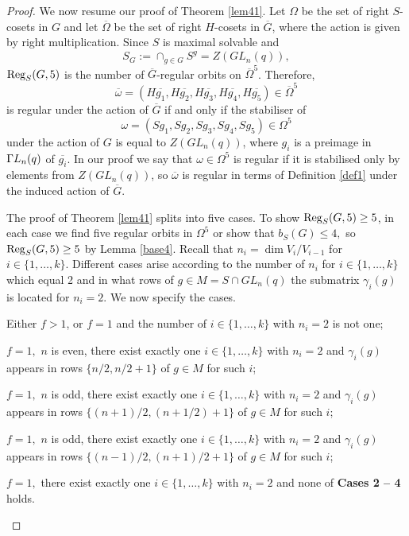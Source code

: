 \begin{proof}
We now resume our proof of Theorem \ref{lem41}.
Let $\Omega$ be the set of right $S$-cosets in $G$ and let $\overline{\Omega}$ be the set of right $H$-cosets in $\overline{G}$, where the action is given by  right multiplication.  Since $S$ is maximal solvable and $$S_{G}:=\cap_{g \in G} S^g=Z(GL_n(q)),$$ $\mathrm{Reg}_S(G,5)$ is the number of $\overline{G}$-regular orbits on  $\overline{\Omega}^5$.   Therefore, $$\overline{\omega}=(H\overline{g_1},H\overline{g_2},H\overline{g_3},H\overline{g_4},H\overline{g_5}) \in \overline{\Omega}^5$$ is regular under the action of $\overline{G}$ if and only if the stabiliser of $$ \omega =(Sg_1, Sg_2, Sg_3,Sg_4, Sg_5) \in \Omega^5$$ under the action of $G$ is equal to $Z(GL_n(q))$, where $g_i$ is a preimage in ${{\Gamma L}}_n(q)$ of $\overline{g_i}.$  
In our proof we say that   $\omega \in \Omega^5$ is regular if it is stabilised only by elements from $Z(GL_n(q))$, so $\overline{\omega}$ is regular in terms of Definition \ref{def1} under the induced  action of $\overline{G}.$  

The proof of Theorem \ref{lem41} splits into five cases. To show $\mathrm{Reg}_S(G,5) \ge 5$, in each case we find five regular orbits in $\Omega^5$ or show that $b_S(G)\le 4,$ so $\mathrm{Reg}_S(G,5) \ge 5$ by Lemma \ref{base4}. Recall that $n_i = \dim V_i/V_{i-1}$ for $i \in \{1, \ldots, k\}.$  Different cases arise according to the number of $n_i$ for $i \in \{1, \ldots, k\}$ which equal 2  and in what rows of  $g \in M=S\cap GL_n(q)$ the submatrix $\gamma_i(g)$ is located for $n_i=2.$ We now specify the cases.
\begin{description}[before={\renewcommand\makelabel[1]{\bfseries ##1}}]
\item[{\bf Case 1.}] Either $f>1$, or $f=1$ and the number of $i \in \{1, \ldots, k\}$ with $n_i=2$ is not one;
\item[{\bf Case 2.}] $f=1, $ $n$ is even, there exist exactly one $i \in \{1, \ldots, k\}$ with $n_i=2$ and $\gamma_i(g)$ appears in rows  $\{n/2,n/2+1\}$ of $g \in M$ for such $i$;
\item[{\bf Case 3.}] $f=1, $ $n$ is odd, there exist exactly one $i \in \{1, \ldots, k\}$ with $n_i=2$ and $\gamma_i(g)$ appears in rows  $\{(n+1)/2,(n+1/2)+1\}$ of $g \in M$ for such $i$;
\item[{\bf Case 4.}] $f=1, $ $n$ is odd, there exist exactly one $i \in \{1, \ldots, k\}$ with $n_i=2$ and $\gamma_i(g)$ appears in rows  $\{(n-1)/2,(n+1)/2+1\}$ of $g \in M$ for such $i$;
\item[{\bf Case 5.}] $f=1,$ there exist exactly one $i \in \{1, \ldots, k\}$ with $n_i=2$ and none of {\bf Cases 2 -- 4} holds. 
\end{description}


\end{proof}
